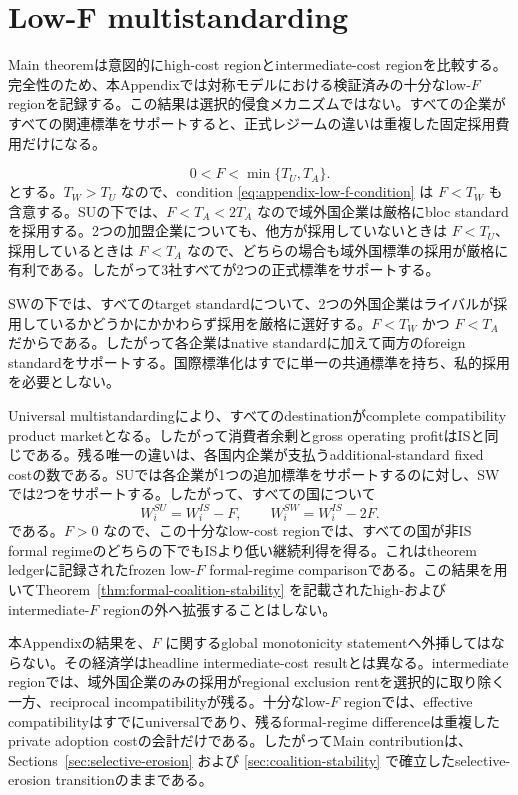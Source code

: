 \section{Low-F multistandarding}
\label{app:low-f}

Main theoremは意図的にhigh-cost regionとintermediate-cost regionを比較する。完全性のため、本Appendixでは対称モデルにおける検証済みの十分なlow-$F$ regionを記録する。この結果は選択的侵食メカニズムではない。すべての企業がすべての関連標準をサポートすると、正式レジームの違いは重複した固定採用費用だけになる。

\begin{equation}
0<F<\min\{T_U,T_A\}.
\label{eq:appendix-low-f-condition}
\end{equation}
とする。$T_W>T_U$ なので、condition \eqref{eq:appendix-low-f-condition} は $F<T_W$ も含意する。SUの下では、$F<T_A<2T_A$ なので域外国企業は厳格にbloc standardを採用する。2つの加盟企業についても、他方が採用していないときは $F<T_U$、採用しているときは $F<T_A$ なので、どちらの場合も域外国標準の採用が厳格に有利である。したがって3社すべてが2つの正式標準をサポートする。

SWの下では、すべてのtarget standardについて、2つの外国企業はライバルが採用しているかどうかにかかわらず採用を厳格に選好する。$F<T_W$ かつ $F<T_A$ だからである。したがって各企業はnative standardに加えて両方のforeign standardをサポートする。国際標準化はすでに単一の共通標準を持ち、私的採用を必要としない。

Universal multistandardingにより、すべてのdestinationがcomplete compatibility product marketとなる。したがって消費者余剰とgross operating profitはISと同じである。残る唯一の違いは、各国内企業が支払うadditional-standard fixed costの数である。SUでは各企業が1つの追加標準をサポートするのに対し、SWでは2つをサポートする。したがって、すべての国について
\begin{equation}
\boxed{
W_i^{SU}=W_i^{IS}-F,
\qquad
W_i^{SW}=W_i^{IS}-2F.
}
\label{eq:appendix-low-f-welfare}
\end{equation}
である。$F>0$ なので、この十分なlow-cost regionでは、すべての国が非IS formal regimeのどちらの下でもISより低い継続利得を得る。これはtheorem ledgerに記録されたfrozen low-$F$ formal-regime comparisonである。この結果を用いてTheorem~\ref{thm:formal-coalition-stability} を記載されたhigh-およびintermediate-$F$ regionの外へ拡張することはしない。

本Appendixの結果を、$F$ に関するglobal monotonicity statementへ外挿してはならない。その経済学はheadline intermediate-cost resultとは異なる。intermediate regionでは、域外国企業のみの採用がregional exclusion rentを選択的に取り除く一方、reciprocal incompatibilityが残る。十分なlow-$F$ regionでは、effective compatibilityはすでにuniversalであり、残るformal-regime differenceは重複したprivate adoption costの会計だけである。したがってMain contributionは、Sections~\ref{sec:selective-erosion} および \ref{sec:coalition-stability} で確立したselective-erosion transitionのままである。
